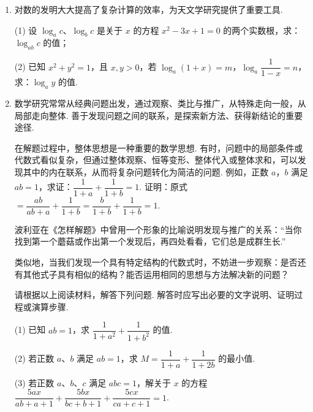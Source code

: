 \documentclass[a4paper,11pt]{article}
\begin{document}
\begin{enumerate}
\item 对数的发明大大提高了复杂计算的效率，为天文学研究提供了重要工具.

(1) 设 $\log_a c$、$\log_b c$ 是关于 $x$ 的方程 $x^2-3x+1=0$ 的两个实数根，求：$\log_{ab}c$ 的值；

(2) 已知 $x^2+y^2=1$，且 $x,y>0$，若 $\log_a(1+x)=m$，$\log_a\dfrac{1}{1-x}=n$，求：$\log_a y$ 的值.

\ifanswer
\solbegin
{}
\solend
\fi

\item 数学研究常常从经典问题出发，通过观察、类比与推广，从特殊走向一般，从局部走向整体. 善于发现问题之间的联系，是探索新方法、获得新结论的重要途径.

在解题过程中，整体思想是一种重要的数学思想. 有时，问题中的局部条件或代数式看似复杂，但通过整体观察、恒等变形、整体代入或整体求和，可以发现其中的内在联系，从而将复杂问题转化为简洁的问题. 例如，正数 $a$，$b$ 满足 $ab=1$，求证：$\dfrac{1}{1+a}+\dfrac{1}{1+b}=1$. 证明：原式 $=\dfrac{ab}{ab+a}+\dfrac{1}{1+b}=\dfrac{b}{1+b}+\dfrac{1}{1+b}=1$.

波利亚在《怎样解题》中曾用一个形象的比喻说明发现与推广的关系：“当你找到第一个蘑菇或作出第一个发现后，再四处看看，它们总是成群生长.”

类似地，当我们发现一个具有特定结构的代数式时，不妨进一步观察：是否还有其他式子具有相似的结构？能否运用相同的思想与方法解决新的问题？

请根据以上阅读材料，解答下列问题. 解答时应写出必要的文字说明、证明过程或演算步骤.

(1) 已知 $ab=1$，求 $\dfrac{1}{1+a^2}+\dfrac{1}{1+b^2}$ 的值.

(2) 若正数 $a$、$b$ 满足 $ab=1$，求 $M=\dfrac{1}{1+a}+\dfrac{1}{1+2b}$ 的最小值.

(3) 若正数 $a$、$b$、$c$ 满足 $abc=1$，解关于 $x$ 的方程 $\dfrac{5ax}{ab+a+1}+\dfrac{5bx}{bc+b+1}+\dfrac{5cx}{ca+c+1}=1$.


\end{enumerate}
\end{document}
